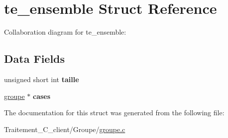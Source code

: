 \hypertarget{structte__ensemble}{}\section{te\+\_\+ensemble Struct Reference}
\label{structte__ensemble}


Collaboration diagram for te\+\_\+ensemble\+:
\subsection*{Data Fields}
\begin{DoxyCompactItemize}
\item 
unsigned short int {\bfseries taille}\hypertarget{structte__ensemble_a87635cc952ac19449af46738bb99fbc0}{}\label{structte__ensemble_a87635cc952ac19449af46738bb99fbc0}

\item 
\hyperlink{groupe_8h_af0a904698ccc1020e44b1b2afc0e790c}{groupe} $\ast$ {\bfseries cases}\hypertarget{structte__ensemble_af27395c49fadab8fc66f285e62b3f503}{}\label{structte__ensemble_af27395c49fadab8fc66f285e62b3f503}

\end{DoxyCompactItemize}


The documentation for this struct was generated from the following file\+:\begin{DoxyCompactItemize}
\item 
Traitement\+\_\+\+C\+\_\+client/\+Groupe/\hyperlink{groupe_8c}{groupe.\+c}\end{DoxyCompactItemize}
